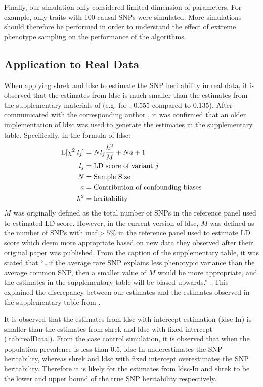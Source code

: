 	Finally, our simulation only considered limited dimension of parameters. 
	For example, only traits with 100 causal \glspl{SNP} were simulated. 
	More simulations should therefore be performed in order to understand the effect of extreme phenotype sampling on the performance of the algorithms. 
	
	\subsection{Application to Real Data}
	When applying \gls{shrek} and \gls{ldsc} to estimate the \gls{SNP} heritability in real data, it is observed that the estimates from \gls{ldsc} is much smaller than the estimates from the supplementary materials of \citet{Bulik-Sullivan2015} (e.g. for , 0.555 compared to 0.135).
	After communicated with the corresponding author \citep{Bulik-Sullivan2015c}, it was confirmed that an older implementation of \gls{ldsc} was used to generate the estimates in the supplementary table.
	Specifically, in the formula of \gls{ldsc}:
	\begin{align}
		\mathrm{E}[\chi^2|l_j] &= Nl_j\frac{h^2}{M}+Na+1 \\
		l_j &= \text{LD score of variant}\ j \notag\\
		N &= \text{Sample Size}\notag\\
		a &= \text{Contribution of confounding biases}\notag\\
		h^2 &= \text{heritability}\notag 
	\end{align}
	$M$ was originally defined as the total number of \glspl{SNP} in the reference panel used to estimated \gls{LD} score.	
	However, in the current version of \gls{ldsc}, $M$ was defined as the number of \glspl{SNP} with \gls{maf}$ >5\%$ in the reference panel used to estimate \gls{LD} score which \citet{Bulik-Sullivan2015} deem more appropriate based on new data they observed after their original paper was published.
	From the caption of the supplementary table, it was stated that ``\dots if the average rare \gls{SNP} explains less phenotypic variance than the average common \gls{SNP}, then a smaller value of $M$ would be more appropriate, and the estimates in the supplementary table will be biased upwards.'' \citep{Bulik-Sullivan2015}.
	This explained the discrepancy between our estimates and the estimates observed in the supplementary table from \citet{Bulik-Sullivan2015}.
	
	It is observed that the estimates from \gls{ldsc} with intercept estimation (\gls{ldsc}-In) is smaller than the estimates from \gls{shrek} and \gls{ldsc} with fixed intercept (\cref{tab:realData}).
	From the case control simulation, it is observed that when the population prevalence is less than 0.5, \gls{ldsc}-In underestimates the \gls{SNP} heritability, whereas \gls{shrek} and \gls{ldsc} with fixed intercept overestimates the \gls{SNP} heritability.
	Therefore it is likely for the estimates from \gls{ldsc}-In and \gls{shrek} to be the lower and upper bound of the true \gls{SNP} heritability respectively. 

